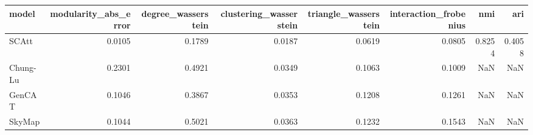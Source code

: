 \begin{tabular}{lrrrrrrr}
\toprule
model & modularity_abs_error & degree_wasserstein & clustering_wasserstein & triangle_wasserstein & interaction_frobenius & nmi & ari \\
\midrule
SCAtt & 0.0105 & 0.1789 & 0.0187 & 0.0619 & 0.0805 & 0.8254 & 0.4058 \\
Chung-Lu & 0.2301 & 0.4921 & 0.0349 & 0.1063 & 0.1009 & NaN & NaN \\
GenCAT & 0.1046 & 0.3867 & 0.0353 & 0.1208 & 0.1261 & NaN & NaN \\
SkyMap & 0.1044 & 0.5021 & 0.0363 & 0.1232 & 0.1543 & NaN & NaN \\
\bottomrule
\end{tabular}
